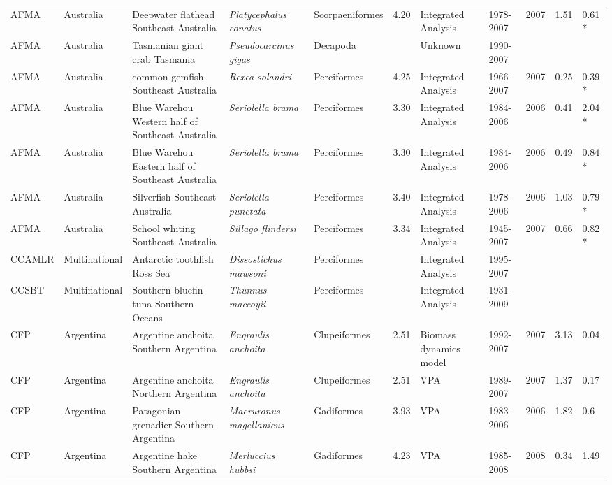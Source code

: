 \begin{longtable}{p{1.5cm}p{1.5cm}p{3cm}p{3cm}p{2.5cm}p{0.9cm}p{1.4cm}p{0.9cm}p{0.9cm}p{0.9cm}p{1cm}}
  AFMA & Australia & Deepwater flathead Southeast Australia & \textit{Platycephalus conatus} & Scorpaeniformes & 4.20 & Integrated Analysis & 1978-2007 & 2007 & 1.51 & 0.61 * \\ 
  AFMA & Australia & Tasmanian giant crab Tasmania & \textit{Pseudocarcinus gigas} & Decapoda &  & Unknown & 1990-2007 &  &  &  \\ 
  AFMA & Australia & common gemfish Southeast Australia & \textit{Rexea solandri} & Perciformes & 4.25 & Integrated Analysis & 1966-2007 & 2007 & 0.25 & 0.39 * \\ 
  AFMA & Australia & Blue Warehou Western half of Southeast Australia & \textit{Seriolella brama} & Perciformes & 3.30 & Integrated Analysis & 1984-2006 & 2006 & 0.41 & 2.04 * \\ 
  AFMA & Australia & Blue Warehou Eastern half of Southeast Australia & \textit{Seriolella brama} & Perciformes & 3.30 & Integrated Analysis & 1984-2006 & 2006 & 0.49 & 0.84 * \\ 
  AFMA & Australia & Silverfish Southeast Australia & \textit{Seriolella punctata} & Perciformes & 3.40 & Integrated Analysis & 1978-2006 & 2006 & 1.03 & 0.79 * \\ 
  AFMA & Australia & School whiting Southeast Australia & \textit{Sillago flindersi} & Perciformes & 3.34 & Integrated Analysis & 1945-2007 & 2007 & 0.66 & 0.82 * \\ 
  CCAMLR & Multinational & Antarctic toothfish Ross Sea & \textit{Dissostichus mawsoni} & Perciformes &  & Integrated Analysis & 1995-2007 &  &  &  \\ 
  CCSBT & Multinational & Southern bluefin tuna Southern Oceans & \textit{Thunnus maccoyii} & Perciformes &  & Integrated Analysis & 1931-2009 &  &  &  \\ 
  CFP & Argentina & Argentine anchoita Southern Argentina & \textit{Engraulis anchoita} & Clupeiformes & 2.51 & Biomass dynamics model & 1992-2007 & 2007 & 3.13 & 0.04 \\ 
  CFP & Argentina & Argentine anchoita Northern Argentina & \textit{Engraulis anchoita} & Clupeiformes & 2.51 & VPA & 1989-2007 & 2007 & 1.37 & 0.17 \\ 
  CFP & Argentina & Patagonian grenadier Southern Argentina & \textit{Macruronus magellanicus} & Gadiformes & 3.93 & VPA & 1983-2006 & 2006 & 1.82 & 0.6 \\ 
  CFP & Argentina & Argentine hake Southern Argentina & \textit{Merluccius hubbsi} & Gadiformes & 4.23 & VPA & 1985-2008 & 2008 & 0.34 & 1.49 \\ 

\end{longtable}
